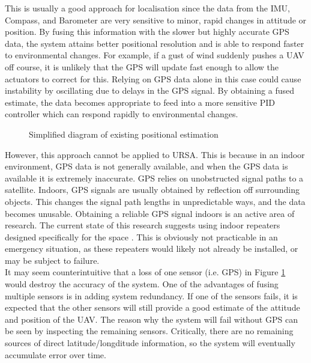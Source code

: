 \documentclass[capstone_report.tex]{subfiles}
\begin{document}
This is usually a good approach for localisation since the data from the IMU, Compass, and Barometer are very sensitive to minor, rapid changes in attitude or position. By fusing this information with the slower but highly accurate GPS data, the system attains better positional resolution and is able to respond faster to environmental changes. For example, if a gust of wind suddenly pushes a UAV off course, it is unlikely that the GPS will update fast enough to allow the actuators to correct for this. Relying on GPS data alone in this case could cause instability by oscillating due to delays in the GPS signal. By obtaining a fused estimate, the data becomes appropriate to feed into a more sensitive PID controller which can respond rapidly to environmental changes.

\begin{figure}[H]
	
	\caption{Simplified diagram of existing positional estimation\label{fig:estAlg2}}
\end{figure}

However, this approach cannot be applied to URSA. This is because in an indoor environment, GPS data is not generally available, and when the GPS data is available it is extremely inaccurate. GPS relies on unobstructed signal paths to a satellite. Indoors, GPS signals are usually obtained by reflection off surrounding objects. This changes the signal path lengths in unpredictable ways, and the data becomes unusable. Obtaining a reliable GPS signal indoors is an active area of research. The current state of this research suggests using indoor repeaters designed specifically for the space \cite{ozsoy}. This is obviously not practicable in an emergency situation, as these repeaters would likely not already be installed, or may be subject to failure. \\

It may seem counterintuitive that a loss of one sensor (i.e. GPS) in Figure \ref{fig:estAlg2} would destroy the accuracy of the system. One of the advantages of fusing multiple sensors is in adding system redundancy. If one of the sensors fails, it is expected that the other sensors will still provide a good estimate of the attitude and position of the UAV. The reason why the system will fail without GPS can be seen by inspecting the remaining sensors. Critically, there are no remaining sources of direct latitude/longditude information, so the system will eventually accumulate error over time. \\
\end{document}
